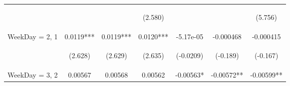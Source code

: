 \documentclass[]{article}
\begin{document}
\begin{center}
\begin{tabular}{lcccccc}
        \vspace{4pt}     & \begin{footnotesize}\end{footnotesize}         & \begin{footnotesize}\end{footnotesize}         & \begin{footnotesize}(2.580)\end{footnotesize}  & \begin{footnotesize}\end{footnotesize}          & \begin{footnotesize}\end{footnotesize}         & \begin{footnotesize}(5.756)\end{footnotesize}  \\
        WeekDay = 2, 1   & 0.0119***                                      & 0.0119***                                      & 0.0120***                                      & -5.17e-05                                       & -0.000468                                      & -0.000415                                      \\
        \vspace{4pt}     & \begin{footnotesize}(2.628)\end{footnotesize}  & \begin{footnotesize}(2.629)\end{footnotesize}  & \begin{footnotesize}(2.635)\end{footnotesize}  & \begin{footnotesize}(-0.0209)\end{footnotesize} & \begin{footnotesize}(-0.189)\end{footnotesize} & \begin{footnotesize}(-0.167)\end{footnotesize} \\
        WeekDay = 3, 2   & 0.00567                                        & 0.00568                                        & 0.00562                                        & -0.00563*                                       & -0.00572**                                     & -0.00599**                                     \\

\end{tabular}
\end{center}
\end{document}
